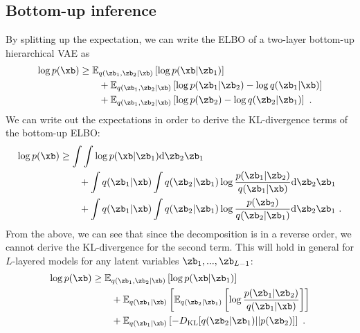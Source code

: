 {\subsection{Bottom-up inference}
    By splitting up the expectation, we can write the ELBO of a two-layer bottom-up hierarchical VAE as
    \begin{align}
        \log p(\xb) &\ge \mathbb{E}_{q(\zb_1, \zb_2|\xb)} \left[ \log p(\xb|\zb_1) \right] \\
    &\qquad + \mathbb{E}_{q(\zb_1,\zb_2|\xb)} \left[ \log p(\zb_1|\zb_2) - \log q(\zb_1|\xb) \right] \notag \\
    &\qquad + \mathbb{E}_{q(\zb_1,\zb_2|\xb)} \left[ \log p(\zb_2) - \log q(\zb_2|\zb_1) \right] \notag \ .
\end{align}
We can write out the expectations in order to derive the KL-divergence terms of the bottom-up ELBO:
\begin{align}
    \log p(\xb) &\ge \int \int \log p(\xb|\zb_1) \text{d}\zb_2\zb_1 \label{eq_hierarchical:2 layer VAE bottom up ELBO integrals} \\
    &\qquad + \int q(\zb_1|\xb) \int q(\zb_2|\zb_1) \log \frac{p(\zb_1|\zb_2)}{q(\zb_1|\xb)} \text{d}\zb_2\zb_1 \notag \\ 
    &\qquad + \int q(\zb_1|\xb) \int q(\zb_2|\zb_1) \log \frac{p(\zb_2)}{q(\zb_2|\zb_1)} \text{d}\zb_2\zb_1 \notag  \ .
\end{align}
From the above, we can see that since the decomposition is in a reverse order, we cannot derive the KL-divergence for the second term. This will hold in general for $L$-layered models for any latent variables  $\zb_1,...,\zb_{L-1}$:
\begin{align}
    \log p(\xb) &\ge \mathbb{E}_{q(\zb_1, \zb_2|\xb)} \left[ \log p(\xb|\zb_1) \right] \\
    &\qquad + \mathbb{E}_{q(\zb_1|\xb)}\left[ \mathbb{E}_{q(\zb_2|\zb_1)}\left[\log \frac{p(\zb_1|\zb_2)}{q(\zb_1|\xb)}\right]\right] \notag \\
    &\qquad + \mathbb{E}_{q(\zb_1|\xb)}\left[-D_\text{KL}[q(\zb_2|\zb_1)||p(\zb_2)]\right] \notag \ .
\end{align}


}
